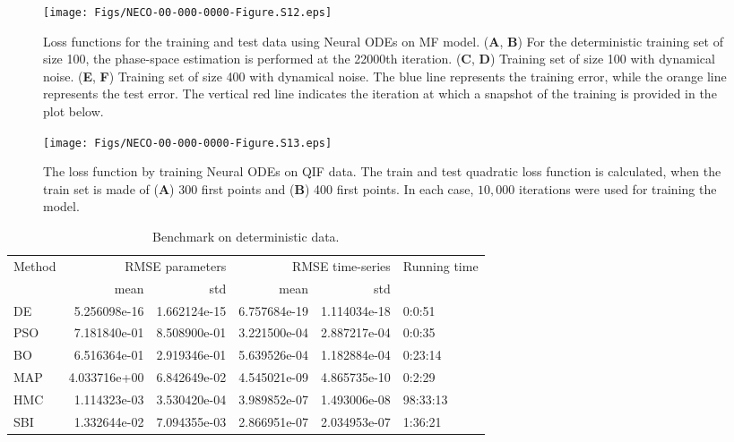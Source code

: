 \documentclass[12pt]{article}
\begin{document}
\begin{figure}[ht]
    \centering
    \texttt{[image: Figs/NECO-00-000-0000-Figure.S12.eps]}
    \renewcommand{\thefigure}{S\arabic{figure}}
    \caption{Loss functions for the training and test data using Neural ODEs on MF model. (\textbf{A}, \textbf{B}) For the deterministic training set of size 100, the phase-space estimation is performed at the 22000th iteration. (\textbf{C}, \textbf{D}) Training set of size 100 with dynamical noise. (\textbf{E}, \textbf{F}) Training set of size 400 with dynamical noise.  The blue line represents the training error, while the orange line represents the test error. The vertical red line indicates the iteration at which a snapshot of the training is provided in the plot below.}
    \label{fig:NeuralODEs_Fit_traces_MPR}
\end{figure}


\begin{figure}[ht]
    \centering
    \texttt{[image: Figs/NECO-00-000-0000-Figure.S13.eps]}
    \renewcommand{\thefigure}{S\arabic{figure}}
    \caption{The loss function by training Neural ODEs on QIF data. The train and test quadratic loss function is calculated, when the train set is made of (\textbf{A}) 300 first points and (\textbf{B}) 400 first points. In each case, $10,000$ iterations were used for training the model.}
    \label{fig:NeuralODE_loss_QIF}
\end{figure}


\clearpage

\begin{table}[p]
    \centering
    \begin{tabular}{lrrrrl}
    {Method} & \multicolumn{2}{r}{RMSE parameters} & \multicolumn{2}{r}{RMSE time-series} & Running time \\
    {} &            mean &           std &             mean & std \\
    \midrule
    DE     &    5.256098e-16 &  1.662124e-15 &     6.757684e-19 &  1.114034e-18 &       0:0:51 \\
    PSO    &    7.181840e-01 &  8.508900e-01 &     3.221500e-04 &  2.887217e-04 &       0:0:35 \\
    BO     &    6.516364e-01 &  2.919346e-01 &     5.639526e-04 &  1.182884e-04 &      0:23:14 \\
    MAP    &    4.033716e+00 &  6.842649e-02 &     4.545021e-09 &  4.865735e-10 &       0:2:29 \\
    HMC    &    1.114323e-03 &  3.530420e-04 &     3.989852e-07 &  1.493006e-08 &     98:33:13 \\
    SBI    &    1.332644e-02 &  7.094355e-03 &     2.866951e-07 &  2.034953e-07 &      1:36:21 \\
    \end{tabular}
\caption{Benchmark on deterministic data.}
\label{tab:ODEdata}
\end{table}
\end{document}
